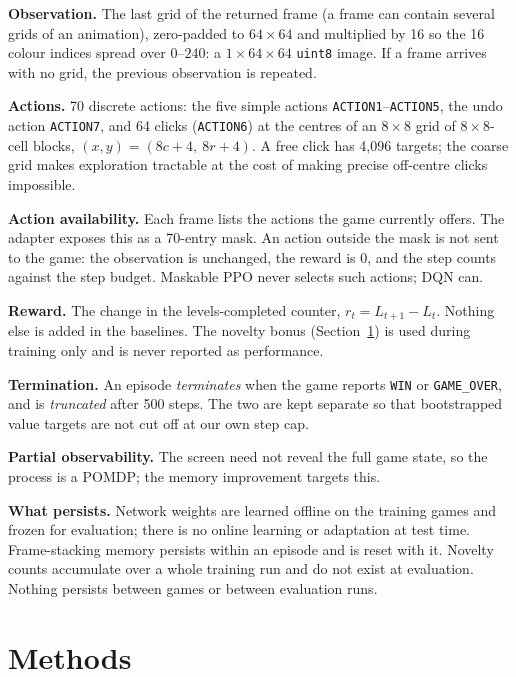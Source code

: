 \documentclass[10pt]{article}
\begin{document}
\textbf{Observation.} The last grid of the returned frame (a frame can contain several grids of an animation), zero-padded to $64\times64$ and multiplied by 16 so the 16 colour indices spread over $0$--$240$: a $1\times64\times64$ \texttt{uint8} image. If a frame arrives with no grid, the previous observation is repeated.

\textbf{Actions.} 70 discrete actions: the five simple actions \texttt{ACTION1}--\texttt{ACTION5}, the undo action \texttt{ACTION7}, and 64 clicks (\texttt{ACTION6}) at the centres of an $8\times8$ grid of $8\times8$-cell blocks, $(x, y) = (8c+4,\ 8r+4)$. A free click has 4,096 targets; the coarse grid makes exploration tractable at the cost of making precise off-centre clicks impossible.

\textbf{Action availability.} Each frame lists the actions the game currently offers. The adapter exposes this as a 70-entry mask. An action outside the mask is not sent to the game: the observation is unchanged, the reward is 0, and the step counts against the step budget. Maskable PPO never selects such actions; DQN can.

\textbf{Reward.} The change in the levels-completed counter, $r_t = L_{t+1} - L_t$. Nothing else is added in the baselines. The novelty bonus (Section~\ref{sec:methods}) is used during training only and is never reported as performance.

\textbf{Termination.} An episode \emph{terminates} when the game reports \texttt{WIN} or \texttt{GAME\_OVER}, and is \emph{truncated} after 500 steps. The two are kept separate so that bootstrapped value targets are not cut off at our own step cap.

\textbf{Partial observability.} The screen need not reveal the full game state, so the process is a POMDP; the memory improvement targets this.

\textbf{What persists.} Network weights are learned offline on the training games and frozen for evaluation; there is no online learning or adaptation at test time. Frame-stacking memory persists within an episode and is reset with it. Novelty counts accumulate over a whole training run and do not exist at evaluation. Nothing persists between games or between evaluation runs.

\section{Methods}
\label{sec:methods}
\end{document}
